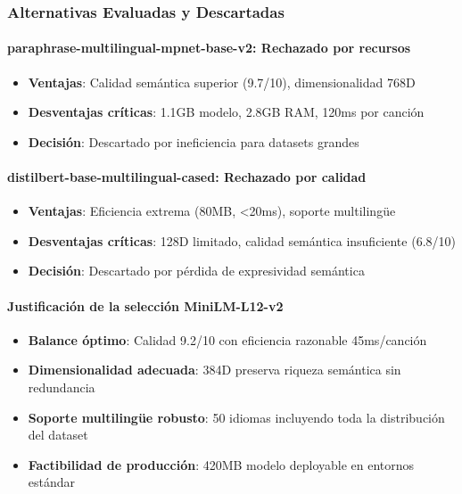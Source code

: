 \documentclass[12pt,a4paper]{report}
\begin{document}
\subsubsection{Alternativas Evaluadas y Descartadas}

\paragraph{paraphrase-multilingual-mpnet-base-v2: Rechazado por recursos}
\begin{itemize}
    \item \textbf{Ventajas}: Calidad semántica superior (9.7/10), dimensionalidad 768D
    \item \textbf{Desventajas críticas}: 1.1GB modelo, 2.8GB RAM, 120ms por canción
    \item \textbf{Decisión}: Descartado por ineficiencia para datasets grandes
\end{itemize}

\paragraph{distilbert-base-multilingual-cased: Rechazado por calidad}
\begin{itemize}
    \item \textbf{Ventajas}: Eficiencia extrema (80MB, <20ms), soporte multilingüe
    \item \textbf{Desventajas críticas}: 128D limitado, calidad semántica insuficiente (6.8/10)
    \item \textbf{Decisión}: Descartado por pérdida de expresividad semántica
\end{itemize}

\paragraph{Justificación de la selección MiniLM-L12-v2}
\begin{itemize}
    \item \textbf{Balance óptimo}: Calidad 9.2/10 con eficiencia razonable 45ms/canción
    \item \textbf{Dimensionalidad adecuada}: 384D preserva riqueza semántica sin redundancia
    \item \textbf{Soporte multilingüe robusto}: 50 idiomas incluyendo toda la distribución del dataset
    \item \textbf{Factibilidad de producción}: 420MB modelo deployable en entornos estándar
\end{itemize}
\end{document}
